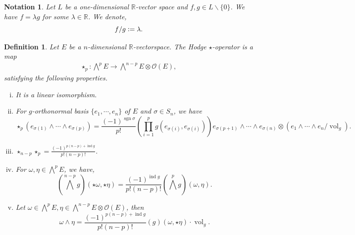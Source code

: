 \documentclass[8pt]{article}
\newtheorem{definition}{Definition}[section]
\newtheorem{notation}{Notation}[section]
\DeclareMathOperator{\ind}{ind}
\DeclareMathOperator{\sgn}{sgn}
\DeclareMathOperator{\vol}{vol}
\newcommand{\defeq}{\vcentcolon=}
\newcommand{\R}[0]{\mathbb{R}}
\begin{document}
\begin{notation}
  Let $L$ be a one-dimensional $\R$-vector space and $f,g\in L\backslash\{0\}$. We have $f = \lambda g$ for some $\lambda\in\R$. We denote,
  \begin{equation*}
    f/g \defeq \lambda.
  \end{equation*}
\end{notation}

\begin{definition}
  Let $E$ be a $n$-dimensional $\R$-vectorspace. The Hodge $\star$-operator is a map 
  \begin{align*}
    \star_p:\bigwedge^p E\to\bigwedge^{n-p}E\otimes \mathcal{O}(E),
  \end{align*}
  satisfying the following properties.
  \begin{enumerate}[i).]
    \item It is a linear isomorphism.
    \item For $g$-orthonormal basis $\{e_1,\cdots,e_n\}$ of $E$ and $\sigma\in S_n$, we have 
    \begin{equation*}
      \star_p (e_{\sigma(1)}\wedge\cdots\wedge e_{\sigma(p)}) = {\frac {(-1)^{\sgn\sigma}} {p!}}\left(\prod_{i=1}^pg(e_{\sigma(i)},e_{\sigma(i)})\right)e_{\sigma(p+1)}\wedge\cdots\wedge e_{\sigma(n)}\otimes (e_1\wedge\cdots\wedge e_n/\vol_g).
    \end{equation*}
    \item $\star_{n-p}\star_p = {\frac {(-1)^{p(n-p)+\ind g}} {p!(n-p)!}}$.
    \item For $\omega,\eta\in\bigwedge^p E$, we have,
    \begin{equation*}
      \left(\bigwedge^{n-p}g\right)(\star\omega,\star\eta) = {\frac {(-1)^{\ind g}} {p!(n-p)!}}\left(\bigwedge^p g\right)(\omega,\eta).
    \end{equation*}
    \item Let $\omega\in\bigwedge^pE,\eta\in\bigwedge^{n-p}E\otimes\mathcal{O}(E)$, then 
    \begin{equation*}
      \omega\wedge\eta = {\frac {(-1)^{p(n-p)+\ind g}} {p!(n-p)!}}\left(g\right)(\omega,\star\eta)\cdot\vol_g.
    \end{equation*}
  \end{enumerate}
  \label{definition_hodge_star_operator}
\end{definition}
\end{document}
